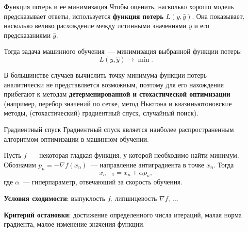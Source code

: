 \documentclass[notheorems, handout]{beamer}
\begin{document}
\begin{frame}{Функция потерь и ее минимизация}
	Чтобы оценить, насколько хорошо модель предсказывает ответы, используется {\bf функция потерь} $L(y, \hat{y})$. Она показывает, насколько велико расхождение между истинными значениями $y$ и его предсказаниями $\hat{y}$.\bigskip

	Тогда задача машинного обучения~--- минимизация выбранной функции потерь:
	\[
		L(y, \hat y)\longrightarrow \min.
	\]\smallskip

	В большинстве случаев вычислить точку минимума функции потерь аналитически не представляется возможным, поэтому для его нахождения прибегают к методам \textbf{детерменированной и стохастической оптимизации} (например, перебор значений по сетке, метод Ньютона и квазиньютоновские методы, (стохастический) градиентный спуск, случайный поиск).

\end{frame}

\begin{frame}{Градиентный спуск}
	Градиентный спуск является наиболее распространенным алгоритмом оптимизации в машинном обучении.\medskip

	Пусть $f$~--- некоторая гладкая функция, у которой необходимо найти минимум. Обозначим $p_n=-\nabla f(x_n)$~--- направление антиградиента в точке $x_n$. Тогда
	\[
		x_{n+1}=x_n+\alpha p_n,
	\]
	где $\alpha$~--- гиперпараметр, отвечающий за скорость обучения.\medskip

	\textbf{Условия сходимости}: выпуклость $f$, липшицевость $\nabla f$, ...\medskip

	\textbf{Критерий остановки}: достижение определенного числа итераций, малая норма градиента, малое изменение значения функции.
\end{frame}
\end{document}
